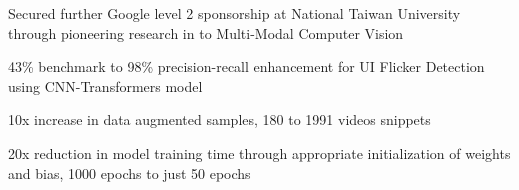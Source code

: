 \begin{cventries}
{\begin{cvitems}
        \item {Secured further Google level 2 sponsorship at National Taiwan University through pioneering research in to Multi-Modal Computer Vision}
        \item {43\% benchmark to 98\% precision-recall enhancement for UI Flicker Detection using CNN-Transformers model}
        \item{10x increase in data augmented samples, 180 to 1991 videos snippets}
        \item {20x reduction in model training time through appropriate initialization of weights and bias, 1000 epochs to just 50 epochs}
      \end{cvitems}
    }




\end{cventries}
